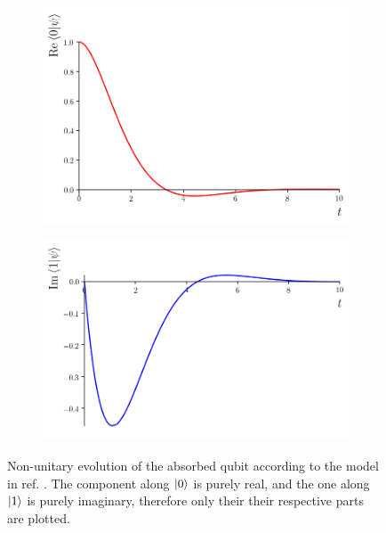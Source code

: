 \begin{figure} %
  \centering
  \begin{subfigure}{0.49\textwidth}
    \includegraphics[width=\linewidth]{img/2ldetect/re_psi0_t.png}
    \subcaption{}\label{fig:absorbed-qubit-components:re0}
  \end{subfigure}
  \begin{subfigure}{0.49\textwidth}
    \includegraphics[width=\linewidth]{img/2ldetect/im_psi1_t.png}
    \subcaption{}\label{fig:absorbed-qubit-components:im1}
  \end{subfigure}
  \caption[
    Non-unitary evolution of absorbed qubit
  ]{
    Non-unitary evolution of the absorbed qubit
    according to the model in
    ref. \cite[\it ``Emission from a two-level system'']{RuschhauptAbsorption}.
    The component along $\ket{0}$ is purely real,
    and the one along $\ket{1}$ is purely imaginary,
    therefore only their their respective parts are plotted.
  }\label{fig:absorbed-qubit-components}
\end{figure}

